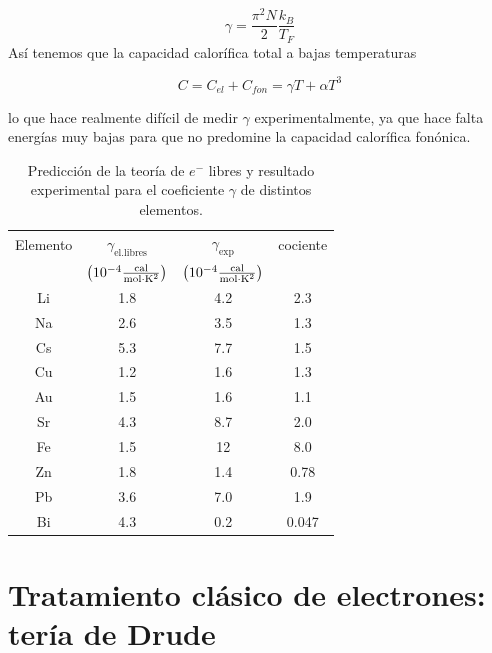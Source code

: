 \begin{equation}
	\gamma = \frac{\pi^2 N}{2} \frac{k_B}{T_F}
\end{equation}
Así tenemos que la capacidad calorífica total a bajas temperaturas
\begin{mybox}
\begin{equation}
	C=C_{el}+C_{fon}= \gamma T + \alpha T^3
\end{equation}
\end{mybox}
lo que hace realmente difícil de medir $\gamma$ experimentalmente, ya que hace falta energías muy bajas para que no predomine la capacidad calorífica fonónica.

\begin{table}[h!] \centering
	\begin{tabular}{cccc} 
		Elemento & $\gamma_{\text{el.libres}}$ &  $\gamma_{\text{exp}}$ & cociente \\
		& $\left( 10^{-4} \frac{\text{cal}}{\text{mol}\cdot\text{K}^2} \right)$& $\left( 10^{-4} \frac{\text{cal}}{\text{mol}\cdot\text{K}^2} \right)$  &  \\ \hline
		Li & 1.8 & 4.2 & 2.3 \\
		Na & 2.6 & 3.5 & 1.3 \\
		Cs & 5.3 & 7.7 & 1.5 \\
		Cu & 1.2 & 1.6 & 1.3 \\
		Au & 1.5 & 1.6 & 1.1 \\
		Sr & 4.3 & 8.7 & 2.0 \\
		Fe & 1.5 & 12 & 8.0 \\
		Zn & 1.8 & 1.4 & 0.78 \\
		Pb & 3.6 & 7.0 & 1.9 \\
		Bi & 4.3 & 0.2 & 0.047 
	\end{tabular}	
	\caption{Predicción de la teoría de $e^-$ libres y resultado experimental para el coeficiente $\gamma$ de distintos elementos.}
	\label{Tab:06-01}
\end{table}

\section{Tratamiento clásico de electrones: tería de Drude}

